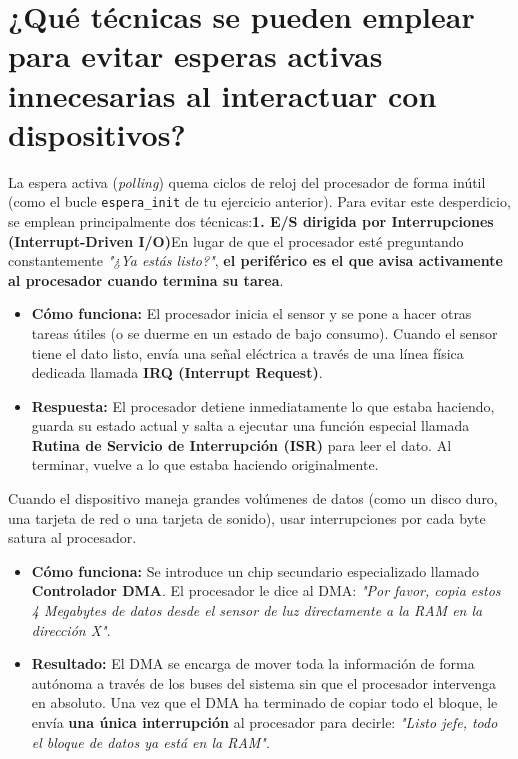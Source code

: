 \documentclass{article}
\begin{document}
 \section{¿Qué técnicas se pueden emplear para evitar esperas activas innecesarias al interactuar 
con dispositivos? }

 La espera activa (\textit{polling}) quema ciclos de reloj del procesador de forma inútil (como el bucle \verb|espera_init| de tu ejercicio anterior). Para evitar este desperdicio, se emplean principalmente dos técnicas:\textbf{1. E/S dirigida por Interrupciones (Interrupt-Driven I/O)}En lugar de que el procesador esté preguntando constantemente \textit{"¿Ya estás listo?"}, \textbf{el periférico es el que avisa activamente al procesador cuando termina su tarea}.

\begin{itemize}
    \item \textbf{Cómo funciona:} El procesador inicia el sensor y se pone a hacer otras tareas útiles (o se duerme en un estado de bajo consumo). Cuando el sensor tiene el dato listo, envía una señal eléctrica a través de una línea física dedicada llamada \textbf{IRQ (Interrupt Request)}.
    \item \textbf{Respuesta:} El procesador detiene inmediatamente lo que estaba haciendo, guarda su estado actual y salta a ejecutar una función especial llamada \textbf{Rutina de Servicio de Interrupción (ISR)} para leer el dato. Al terminar, vuelve a lo que estaba haciendo originalmente.
\end{itemize}

 Cuando el dispositivo maneja grandes volúmenes de datos (como un disco duro, una tarjeta de red o una tarjeta de sonido), usar interrupciones por cada byte satura al procesador.

\begin{itemize}
    \item \textbf{Cómo funciona:} Se introduce un chip secundario especializado llamado \textbf{Controlador DMA}. El procesador le dice al DMA: \textit{"Por favor, copia estos 4 Megabytes de datos desde el sensor de luz directamente a la RAM en la dirección X"}.
    \item \textbf{Resultado:} El DMA se encarga de mover toda la información de forma autónoma a través de los buses del sistema sin que el procesador intervenga en absoluto. Una vez que el DMA ha terminado de copiar todo el bloque, le envía \textbf{una única interrupción} al procesador para decirle: \textit{"Listo jefe, todo el bloque de datos ya está en la RAM"}.
\end{itemize}
 
\end{document}

